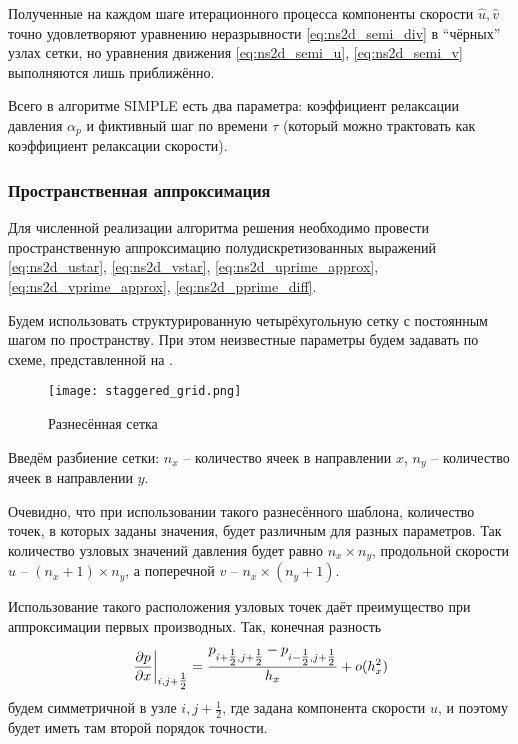 Полученные на каждом шаге итерационного процесса компоненты скорости $\hat u, \hat v$
точно удовлетворяют уравнению неразрывности \eqref{eq:ns2d_semi_div} в ``чёрных'' узлах сетки, но
уравнения движения \eqref{eq:ns2d_semi_u}, \eqref{eq:ns2d_semi_v} выполняются лишь приближённо.

Всего в алгоритме SIMPLE есть два параметра: коэффициент
релаксации давления $\alpha_p$ и фиктивный шаг по времени $\tau$ (который можно трактовать как коэффициент релаксации скорости).

\subsubsection{Пространственная аппроксимация}

Для численной реализации алгоритма решения
необходимо провести пространственную аппроксимацию полудискретизованных
выражений
\eqref{eq:ns2d_ustar}, \eqref{eq:ns2d_vstar}, \eqref{eq:ns2d_uprime_approx},
\eqref{eq:ns2d_vprime_approx}, \eqref{eq:ns2d_pprime_diff}.


Будем использовать структурированную четырёхугольную сетку
с постоянным шагом по пространству.
При этом неизвестные параметры будем задавать
по схеме, представленной на .

\begin{figure}[h]
\centering
\texttt{[image: staggered\_grid.png]}
\caption{Разнесённая сетка}
\label{fig:staggered_grid}
\end{figure}

Введём разбиение сетки:
$n_x$ -- количество ячеек в направлении $x$,
$n_y$ -- количество ячеек в направлении $y$.

Очевидно, что при использовании такого разнесённого шаблона,
количество точек, в которых заданы значения, будет
различным для разных параметров.
Так количество узловых значений давления будет равно $n_x \times n_y$,
продольной скорости $u$ -- $(n_x+1) \times n_y$, а поперечной $v$ -- $n_x \times (n_y+1)$.

Использование такого расположения узловых точек
даёт преимущество при аппроксимации
первых производных. Так, конечная разность
\begin{equation*}
\left.\frac{\partial p}{\partial x}\right|_{i, j+\tfrac12} = \frac{p_{i+\tfrac12,j+\tfrac12} - p_{i-\tfrac12,j+\tfrac12}}{h_x} + o(h_x^2)
\end{equation*}
будем симметричной в узле $i,j+\tfrac12$, где задана
компонента скорости $u$, и поэтому будет иметь там второй порядок точности.


